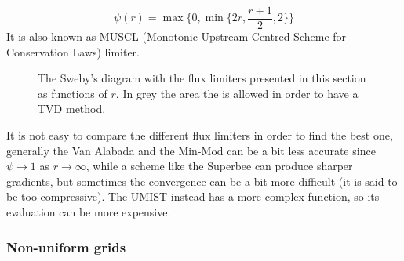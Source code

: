 \begin{itemize}
	\begin{equation}
	\psi(r)=\max \bigg\{0, \min \bigg\{ 2r, \frac{r+1}{2}, 2\bigg\} \bigg\}
	\end{equation}
	It is also known as MUSCL (Monotonic Upstream-Centred Scheme for 
	Conservation Laws) limiter.
%	
\end{itemize}

\begin{figure}
	\centering
	
	\caption[Flux limiter functions]{The Sweby's diagram with the flux limiters 
	presented in this 
	section as functions of $r$. In grey the area the is allowed in order to 
	have a TVD method.}
	\label{fig:fluxlimiters}
\end{figure}

It is not easy to compare the different flux limiters in order to find the 
best 
one, generally the Van Alabada and the Min-Mod can be a bit less accurate 
since 
$\psi \rightarrow 1$ as $r \rightarrow \infty$, while a scheme like the 
Superbee can produce sharper gradients, but sometimes the convergence can be a 
bit more difficult (it is said to be too compressive). The UMIST instead has a 
more complex function, so its evaluation can be more expensive.
%
\subsubsection{Non-uniform grids}
